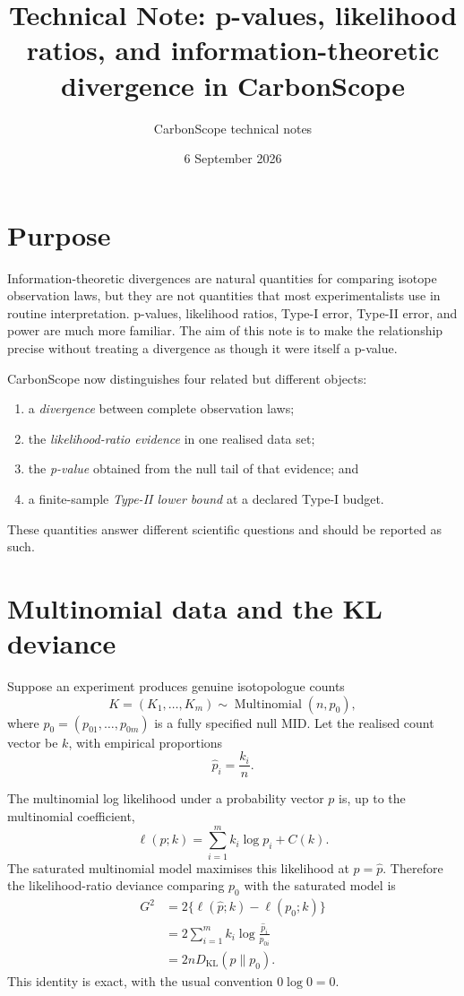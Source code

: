 \documentclass[11pt]{article}
\title{Technical Note: p-values, likelihood ratios, and information-theoretic divergence in CarbonScope}
\author{CarbonScope technical notes}
\date{6 September 2026}
\newcommand{\KL}{D_{\mathrm{KL}}}
\begin{document}
\maketitle

\section{Purpose}

Information-theoretic divergences are natural quantities for comparing isotope
observation laws, but they are not quantities that most experimentalists use in
routine interpretation. p-values, likelihood ratios, Type-I error, Type-II
error, and power are much more familiar. The aim of this note is to make the
relationship precise without treating a divergence as though it were itself a
p-value.

CarbonScope now distinguishes four related but different objects:
\begin{enumerate}
    \item a \emph{divergence} between complete observation laws;
    \item the \emph{likelihood-ratio evidence} in one realised data set;
    \item the \emph{p-value} obtained from the null tail of that evidence; and
    \item a finite-sample \emph{Type-II lower bound} at a declared Type-I budget.
\end{enumerate}

These quantities answer different scientific questions and should be reported
as such.

\section{Multinomial data and the KL deviance}

Suppose an experiment produces genuine isotopologue counts
\begin{equation}
K=(K_1,\ldots,K_m)\sim \operatorname{Multinomial}(n,p_0),
\end{equation}
where $p_0=(p_{01},\ldots,p_{0m})$ is a fully specified null MID. Let the
realised count vector be $k$, with empirical proportions
\begin{equation}
\widehat p_i=\frac{k_i}{n}.
\end{equation}

The multinomial log likelihood under a probability vector $p$ is, up to the
multinomial coefficient,
\begin{equation}
\ell(p;k)=\sum_{i=1}^m k_i\log p_i + C(k).
\end{equation}
The saturated multinomial model maximises this likelihood at
$p=\widehat p$. Therefore the likelihood-ratio deviance comparing $p_0$ with
the saturated model is
\begin{align}
G^2
&=2\{\ell(\widehat p;k)-\ell(p_0;k)\}\\
&=2\sum_{i=1}^m k_i\log\frac{\widehat p_i}{p_{0i}}\\
&=2n\KL(\widehat p\|p_0).
\end{align}
This identity is exact, with the usual convention $0\log 0=0$.
\end{document}

